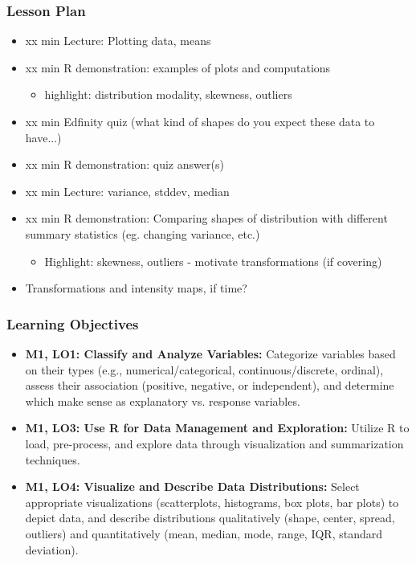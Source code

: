 \begin{frame}
    \frametitle{Lesson Plan}
    \begin{itemize}
        \item xx min Lecture: Plotting data, means
        \item xx min R demonstration: examples of plots and computations
        \begin{itemize}
            \item  highlight: distribution modality, skewness, outliers
        \end{itemize}
        \item xx min Edfinity quiz (what kind of shapes do you expect these data to have...)
        \item xx min R demonstration: quiz answer(s)
        \item xx min Lecture: variance, stddev, median
        \item xx min R demonstration: Comparing shapes of distribution with different summary statistics (eg. changing variance, etc.)
        \begin{itemize}
            \item Highlight: skewness, outliers - motivate transformations (if covering)
        \end{itemize}
        \item Transformations and intensity maps, if time?
    \end{itemize}
\end{frame}

\begin{frame}
    \frametitle{Learning Objectives}
    \begin{itemize}
        \item \textbf{M1, LO1: Classify and Analyze Variables:} Categorize variables based on their types (e.g., numerical/categorical, continuous/discrete, ordinal), assess their association (positive, negative, or independent), and determine which make sense as explanatory vs. response variables.
        \item \textbf{M1, LO3: Use R for Data Management and Exploration:} Utilize R to load, pre-process, and explore data through visualization and summarization techniques.
        \item \textbf{M1, LO4: Visualize and Describe Data Distributions:} Select appropriate visualizations (scatterplots, histograms, box plots, bar plots) to depict data, and describe distributions qualitatively (shape, center, spread, outliers) and quantitatively (mean, median, mode, range, IQR, standard deviation).
    \end{itemize}
\end{frame}

